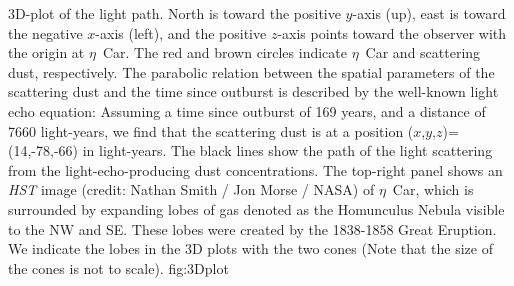 
\ifastroph
   \setcounter{figure}{0}
   \renewcommand{\thefigure}{S\arabic{figure}}
\else
  \ifsuppl
     \setcounter{figure}{-4}
  \fi
\fi


{3D-plot of the light path. North is toward
the positive $y$-axis (up), east is toward the negative $x$-axis
(left), and the positive $z$-axis points toward the observer with the
origin at $\eta$~Car.  The red and brown circles indicate $\eta$~Car
and scattering dust, respectively.  The parabolic relation between the
spatial parameters of the scattering dust and the time since outburst
is described by the well-known light echo equation\cite{Couderc39}:
Assuming a time since outburst of 169 years, and a distance of 7660
light-years\cite{Smith06}, we find that the scattering dust is at a
position ($x$,$y$,$z$)=(14,-78,-66) in light-years.  
The black lines show the path of
the light scattering from the light-echo-producing dust
concentrations.  The top-right panel shows an \textit{HST\/} image
(credit: Nathan Smith / Jon Morse / NASA) of $\eta$~Car, which is
surrounded by expanding lobes of gas denoted as the Homunculus Nebula
visible to the NW and SE. These lobes were created by the 1838-1858
Great Eruption. We indicate the lobes in the 3D plots with the two
cones (Note that the size of the cones is not to scale).
}
{fig:3Dplot}

